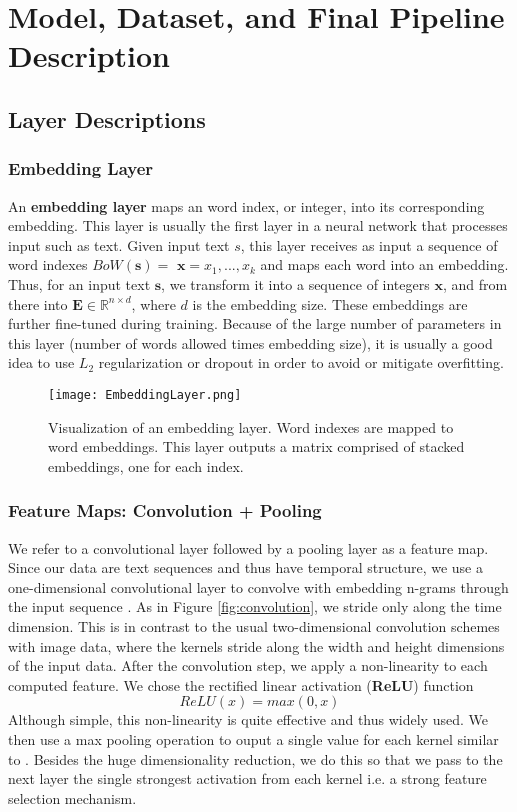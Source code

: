 
\chapter{Model, Dataset, and Final Pipeline Description}
\section{Layer Descriptions}
\subsection{Embedding Layer}\label{embeddinglayer}
An \textbf{embedding layer} maps an word index, or integer, into its corresponding embedding.
This layer is usually the first layer in a neural network that processes input such as text.
Given input text $s$, this layer receives as input a sequence of word indexes $BoW(\bm{s})=$ $\bm{x} = x_1,...,x_k$
and maps each word into an embedding.
Thus, for an input text $\bm{s}$, we transform it into a sequence of integers $\bm{x}$, and from there into $\mathbf{E} \in \mathbb{R}^{n \times d}$, where $d$ is
the embedding size. These embeddings are further fine-tuned during training. Because of the large number of
parameters in this layer (number of words allowed times embedding size), it is usually a good idea to
use $L_2$ regularization or dropout in order to avoid or mitigate overfitting.

\begin{figure}[H]
\caption{Visualization of an embedding layer. Word indexes are mapped to word embeddings. This
layer outputs a matrix comprised of stacked embeddings, one for each index.}
\centering
\texttt{[image: EmbeddingLayer.png]}
\end{figure}

\subsection{Feature Maps: Convolution + Pooling}

We refer to a convolutional layer followed by a pooling layer as a feature map.
Since our data are text sequences and thus have temporal structure, we use a one-dimensional convolutional
layer to convolve with embedding n-grams through the input sequence \cite{waibel1988phoneme}.
As in Figure \ref{fig:convolution}, we stride only along the time dimension. This is in contrast to the usual two-dimensional convolution schemes with image data,
where the kernels stride along the width and height dimensions of the input data. After the convolution step,
we apply a non-linearity to each computed feature. We chose the rectified linear activation (\textbf{ReLU}) function
\[ReLU(x) = max(0,x)\]
Although simple, this non-linearity is quite effective and thus widely used.
We then use a max pooling operation to ouput a single value for each kernel similar to \cite{DBLP:journals/corr/LinCY13}. Besides the huge
dimensionality reduction, we do this so that we pass to the next layer the single strongest activation
from each kernel i.e. a strong feature selection mechanism.

